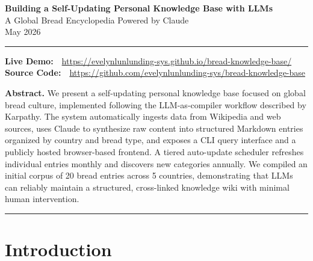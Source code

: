 \documentclass[10.5pt,a4paper]{article}
\begin{document}
\begin{center}
  {\LARGE \textbf{Building a Self-Updating Personal Knowledge Base with LLMs}}\\[5pt]
  {\large A Global Bread Encyclopedia Powered by Claude}\\[3pt]
  {\normalsize May 2026}
\end{center}

\hrule
\vspace{5pt}

\begin{mdframed}[backgroundcolor=gray!8, linecolor=gray!40, linewidth=0.5pt,
                 innertopmargin=5pt, innerbottommargin=5pt,
                 innerleftmargin=8pt, innerrightmargin=8pt]
\small
\textbf{Live Demo:}~~\url{https://evelynlunlunding-sys.github.io/bread-knowledge-base/}\\
\textbf{Source Code:}~~\url{https://github.com/evelynlunlunding-sys/bread-knowledge-base}
\end{mdframed}

\vspace{3pt}

\textbf{Abstract.}
We present a self-updating personal knowledge base focused on global bread culture, implemented following the LLM-as-compiler workflow described by Karpathy. The system automatically ingests data from Wikipedia and web sources, uses Claude to synthesize raw content into structured Markdown entries organized by country and bread type, and exposes a CLI query interface and a publicly hosted browser-based frontend. A tiered auto-update scheduler refreshes individual entries monthly and discovers new categories annually. We compiled an initial corpus of 20 bread entries across 5 countries, demonstrating that LLMs can reliably maintain a structured, cross-linked knowledge wiki with minimal human intervention.

\vspace{3pt}
\hrule
\vspace{3pt}

\section{Introduction}
\end{document}
